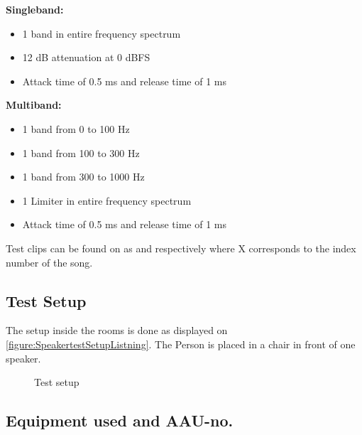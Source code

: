 \noindent\begin{minipage}[t]{0.5\linewidth}
    \textbf{Singleband:}
    \begin{itemize}\addtolength{\itemsep}{-.35\baselineskip} 
    \item 1 band in entire frequency spectrum
    \item 12 dB attenuation at 0 dBFS
    \item Attack time of 0.5 ms and release time of 1 ms
    \end{itemize}
    \end{minipage}%
    \begin{minipage}[t]{0.5\linewidth}
    \textbf{Multiband:}
    \begin{itemize}\addtolength{\itemsep}{-.35\baselineskip} 
    \item 1 band from 0 to 100 Hz
    \item 1 band from 100 to 300 Hz
    \item 1 band from 300 to 1000 Hz
    \item 1 Limiter in entire frequency spectrum
    \item Attack time of 0.5 ms and release time of 1 ms
    \end{itemize}
\end{minipage}\par\bigskip
Test clips can be found on  as  and  respectively where X corresponds to the index number of the song.



\subsection*{Test Setup}
The setup inside the rooms is done as displayed on \autoref{figure:SpeakertestSetupListning}. The Person is placed in a chair in front of one speaker.
\begin{figure}[H]
\centering
{}
\caption{Test setup}
\label{figure:SpeakertestSetupListning}
\end{figure}

\subsection*{Equipment used and AAU-no.}

